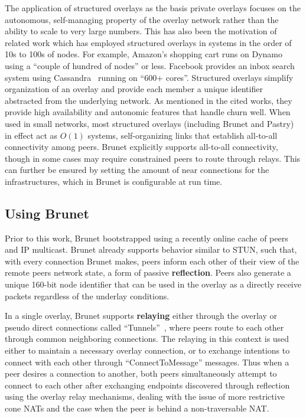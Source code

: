 The application of structured overlays as the basis private overlays focuses on
the autonomous, self-managing property of the overlay network rather than the
ability to scale to very large numbers.  This has also been the motivation of
related work which has employed structured overlays in systems in the order of
10s to 100s of nodes.  For example, Amazon's shopping cart runs on
Dynamo~\cite{dynamo} using a ``couple of hundred of nodes'' or less.  Facebook
provides an inbox search system using Cassandra~\cite{cassandra} running on
``600+ cores''.  Structured overlays simplify organization of an overlay and
provide each member a unique identifier abstracted from the underlying network.
As mentioned in the cited works, they provide high availability and autonomic
features that handle churn well.  When used in small networks, most structured
overlays (including Brunet and Pastry) in effect act as $O(1)$ systems,
self-organizing links that establish all-to-all connectivity among peers.
Brunet explicitly supports all-to-all connectivity, though in some cases may
require constrained peers to route through relays.  This can further be ensured
by setting the amount of near connections for the infrastructures, which in
Brunet is configurable at run time.

\subsection{Using Brunet}
\label{bs:brunet_bootstrapping}

Prior to this work, Brunet bootstrapped using a recently online cache of peers
and IP multicast.  Brunet already supports behavior similar to STUN, such that,
with every connection Brunet makes, peers inform each other of their view of
the remote peers network state, a form of passive \textbf{reflection}.  Peers
also generate a unique 160-bit node identifier that can be used in the overlay
as a directly receive packets regardless of the underlay conditions.

In a single overlay, Brunet supports \textbf{relaying} either through the
overlay or pseudo direct connections called ``Tunnels''~\cite{hpdc08_0}, where
peers route to each other through common neighboring connections.  The relaying
in this context is used either to maintain a necessary overlay connection, or
to exchange intentions to connect with each other through ``ConnectToMessage''
messages.  Thus when a peer desires a connection to another, both peers
simultaneously attempt to connect to each other after exchanging endpoints
discovered through reflection using the overlay relay mechanisms, dealing with
the issue of more restrictive cone NATs and the case when the peer is behind a
non-traversable NAT.  

